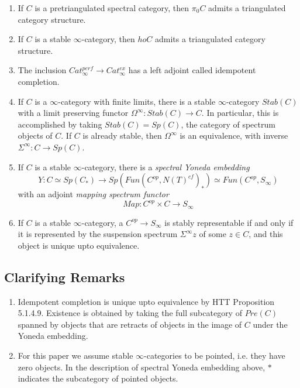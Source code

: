\documentclass[letterpaper]{article}
\theoremstyle{definition}
\begin{document}
\begin{enumerate}
\item If $C$ is a pretriangulated spectral category, then $\pi_0 C$ admits a triangulated category structure.

\item If $C$ is a stable $\infty$-category, then $ho C$ admits a triangulated category structure. 

\item The inclusion $Cat^{perf}_\infty \rightarrow Cat^{ex}_\infty$ has a left adjoint called idempotent completion.

\item If $C$ is a $\infty$-category with finite limits, there is a stable $\infty$-category $Stab(C)$ with a limit preserving functor $\Omega^\infty : Stab(C) \rightarrow C$. In particular, this is accomplished by taking $Stab(C) = Sp(C)$, the category of spectrum objects of $C$. If $C$ is already stable, then $\Omega^\infty$ is an equivalence, with inverse $\Sigma^\infty : C \rightarrow Sp(C)$. 

\item If $C$ is a stable $\infty$-category, there is a \textit{spectral Yoneda embedding}
$$Y : C \simeq Sp(C_*) \rightarrow Sp(Fun(C^{op}, N(T)^{cf})_*) \simeq Fun(C^{op}, S_\infty)$$
with an adjoint \textit{mapping spectrum functor}
$$Map : C^{op} \times C \rightarrow S_\infty$$

\item If $C$ is a stable $\infty$-category, a $C^{op} \rightarrow S_\infty$ is stably representable if and only if it is represented by the suspension spectrum $\Sigma^\infty z$ of some $z \in C$, and this object is unique upto equivalence. 

\end{enumerate}

\subsection{Clarifying Remarks}

\begin{enumerate}
\item Idempotent completion is unique upto equivalence by HTT Proposition 5.1.4.9. Existence is obtained by taking the full subcategory of $Pre(C)$ spanned by objects that are retracts of objects in the image of $C$ under the Yoneda embedding.
\item For this paper we assume stable $\infty$-categories to be pointed, i.e. they have zero objects. In the description of spectral Yoneda embedding above, $*$ indicates the subcategory of pointed objects. 
\end{enumerate}
\end{document}
